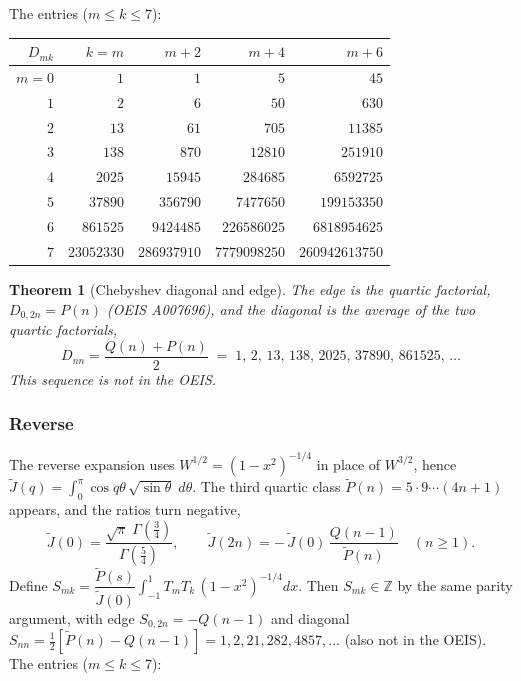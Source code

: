 \documentclass[11pt,a4paper]{article}
\newtheorem{theorem}{Theorem}[section]
\theoremstyle{definition}
\newcommand{\Z}{\mathbb{Z}}
\newcommand{\G}{\Gamma}
\begin{document}
The entries ($m \le k \le 7$):

\begin{tcolorbox}[colback=black!5, colframe=black!5, boxrule=0pt, sharp corners]
\begin{center}
\begin{tabular}{r|rrrr}
$D_{mk}$ & $k=m$ & $m{+}2$ & $m{+}4$ & $m{+}6$ \\
\hline
$m=0$ & $1$        & $1$         & $5$          & $45$ \\
$1$   & $2$        & $6$         & $50$         & $630$ \\
$2$   & $13$       & $61$        & $705$        & $11385$ \\
$3$   & $138$      & $870$       & $12810$      & $251910$ \\
$4$   & $2025$     & $15945$     & $284685$     & $6592725$ \\
$5$   & $37890$    & $356790$    & $7477650$    & $199153350$ \\
$6$   & $861525$   & $9424485$   & $226586025$  & $6818954625$ \\
$7$   & $23052330$ & $286937910$ & $7779098250$ & $260942613750$ \\
\end{tabular}
\end{center}
\end{tcolorbox}

\begin{tcolorbox}[colback=black!5, colframe=black!5, boxrule=0pt, sharp corners]
\begin{theorem}[Chebyshev diagonal and edge]\label{thm:cheb-diag}
The edge is the quartic factorial, $D_{0,2n} = P(n)$
(OEIS A007696), and the diagonal is the \emph{average of the two
quartic factorials},
\[
  D_{nn} = \frac{Q(n) + P(n)}{2}
  \;=\; 1,\, 2,\, 13,\, 138,\, 2025,\, 37890,\, 861525,\, \ldots
\]
This sequence is not in the OEIS.
\end{theorem}
\end{tcolorbox}

\subsubsection*{Reverse}

The reverse expansion uses $W^{1/2} = (1-x^2)^{-1/4}$ in place of
$W^{3/2}$, hence $\widetilde J(q) = \int_0^\pi \cos q\theta\,
\sqrt{\sin\theta}\; d\theta$. The third quartic class
$\widetilde P(n) = 5 \cdot 9 \cdots (4n+1)$ appears, and the ratios
turn negative,
\[
  \widetilde J(0) = \frac{\sqrt\pi\;\G(\tfrac34)}{\G(\tfrac54)},
  \qquad
  \widetilde J(2n) = -\,\widetilde J(0)\,
  \frac{Q(n-1)}{\widetilde P(n)} \quad (n \ge 1).
\]
Define $S_{mk} = \dfrac{\widetilde P(s)}{\widetilde J(0)}
\displaystyle\int_{-1}^{1} T_m T_k\, (1-x^2)^{-1/4} dx$. Then
$S_{mk} \in \Z$ by the same parity argument, with edge
$S_{0,2n} = -Q(n-1)$ and diagonal
$S_{nn} = \tfrac12 [\widetilde P(n) - Q(n-1)] = 1, 2, 21, 282, 4857,
\ldots$ (also not in the OEIS). The entries ($m \le k \le 7$):
\end{document}
